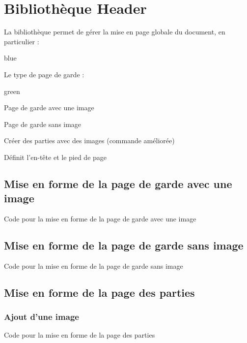 \chapter{Bibliothèque Header}

La bibliothèque  permet de gérer la mise en page globale du document, en particulier : 

\begin{items}{blue}{\Triangle}
  \item Le type de page de garde : 
  \begin{items}{green}{\Triangle}
    \item Page de garde avec une image
    \item Page de garde sans image
  \end{items}
  \item Créer des parties avec des images (commande  améliorée)
  \item Définit l'en-tête et le pied de page
\end{items}
\section{Mise en forme de la page de garde avec une image}

\begin{Latex}{Code pour la mise en forme de la page de garde avec une image}
\end{Latex}


\section{Mise en forme de la page de garde sans image}

\begin{Latex}{Code pour la mise en forme de la page de garde sans image}
\end{Latex}

\section{Mise en forme de la page des parties}

\subsection{Ajout d'une image}
\begin{Latex}{Code pour la mise en forme de la page des parties}
\end{Latex}



